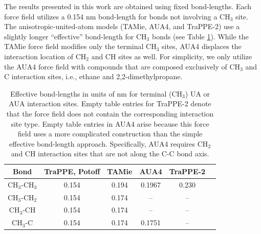 \documentclass[preprint,review,12pt]{elsarticle}
\begin{document}
    
    The results presented in this work are obtained using fixed bond-lengths. Each force field utilizes a 0.154 nm bond-length for bonds not involving a CH$_3$ site. The anisotropic-united-atom models (TAMie, AUA4, and TraPPE-2) use a slightly longer ``effective'' bond-length for CH$_3$ bonds (see Table \ref{tab:bond-lengths}). While the TAMie force field modifies only the terminal CH$_3$ sites, AUA4 displaces the interaction location of CH$_2$ and CH sites as well. For simplicity, we only utilize the AUA4 force field with compounds that are composed exclusively of CH$_3$ and C interaction sites, i.e., ethane and 2,2-dimethylpropane.
    
    \begin{table}[h!]
    	\caption{Effective bond-lengths in units of nm for terminal (CH$_3$) UA or AUA interaction sites. Empty table entries for TraPPE-2 denote that the force field does not contain the corresponding interaction site type. Empty table entries in AUA4 arise because this force field uses a more complicated construction than the simple effective bond-length approach. Specifically, AUA4 requires CH$_2$ and CH interaction sites that are not along the C-C bond axis.} \label{tab:bond-lengths}
    	\begin{center}
    		\begin{tabular}{|c|c|c|c|c|c|}
    			\hline
    			Bond & TraPPE, Potoff & TAMie & AUA4 & TraPPE-2 \\ \hline
    			CH$_3$-CH$_3$ & 0.154 & 0.194 & 0.1967 & 0.230 \\ 
    			CH$_3$-CH$_2$ & 0.154 & 0.174 & -- & -- \\ 
    			CH$_3$-CH & 0.154 & 0.174 & -- & -- \\
    			CH$_3$-C & 0.154 & 0.174 & 0.1751 & -- \\
    			\hline
    		\end{tabular}
    	\end{center} 
    \end{table}
    
\end{document}
